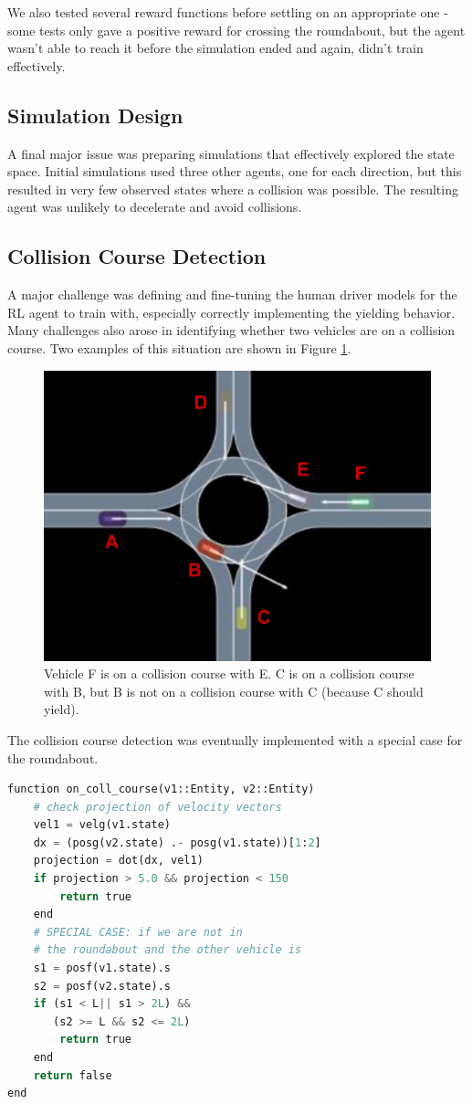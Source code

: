 \documentclass[conference]{IEEEtran}
\begin{document}
We also tested several reward functions before settling on an appropriate one - some tests only gave a positive reward for crossing the roundabout, but the agent wasn't able to reach it before the simulation ended and again, didn't train effectively.

\subsection*{Simulation Design} A final major issue was preparing simulations that effectively explored the state space. Initial simulations used three other agents, one for each direction, but this resulted in very few observed states where a collision was possible. The resulting agent was unlikely to decelerate and avoid collisions.

\subsection*{Collision Course Detection}
A major challenge was defining and fine-tuning the human driver models for the RL agent to train with, especially correctly implementing the yielding behavior. Many challenges also arose in identifying whether two vehicles are on a collision course. Two examples of this situation are shown in Figure \ref{fig:collision}.

\begin{figure}[h!]
	\centering
\includegraphics[width=0.8\linewidth]{figures/example_roundabout.pdf}
\caption{Vehicle F is on a collision course with E. C is on a collision course with B, but B is not on a collision course with C (because C should yield).}
\label{fig:collision}
\end{figure}

The collision course detection was eventually implemented with a special case for the roundabout.
\begin{lstlisting}[language=python]
function on_coll_course(v1::Entity, v2::Entity)
	# check projection of velocity vectors
	vel1 = velg(v1.state)
	dx = (posg(v2.state) .- posg(v1.state))[1:2]
	projection = dot(dx, vel1)
	if projection > 5.0 && projection < 150
		return true
	end
	# SPECIAL CASE: if we are not in
	# the roundabout and the other vehicle is
	s1 = posf(v1.state).s
	s2 = posf(v2.state).s
	if (s1 < L|| s1 > 2L) &&
	   (s2 >= L && s2 <= 2L)
		return true
	end
	return false
end
\end{lstlisting}
\end{document}
